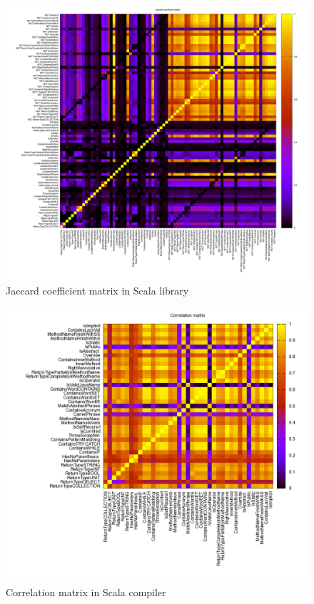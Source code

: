 \documentclass[12pt]{article}
\begin{document}
\begin{figure}[h]
\centering
\includegraphics[width=17cm]{images/corrJAC.png}
\caption{Jaccard coefficient matrix in Scala library}
\label{corrJac}
\end{figure}
\begin{figure}[h]
\centering
\includegraphics[width=17cm]{images/corrCOR2.png}
\caption{Correlation matrix in Scala compiler}
\label{corrCor2}
\end{figure}
\end{document}
